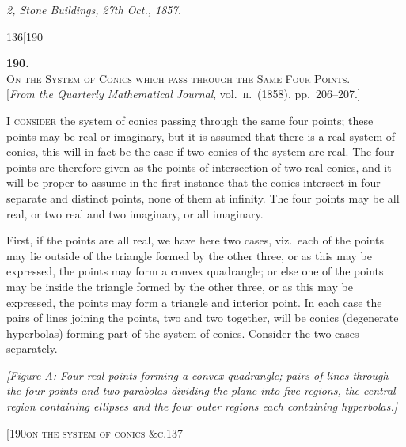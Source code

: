 \documentclass[11pt]{article}
\begin{document}
\medskip
\textit{2, Stone Buildings, 27th Oct., 1857.}

\bigskip
\begin{center}\small\textsc{136}\hfill[190\end{center}

\begin{center}
\textbf{190.}\\[0.5em]
\textsc{On the System of Conics which pass through the Same Four Points.}\\[0.4em]
\small [\textit{From the Quarterly Mathematical Journal}, vol.\ \textsc{ii}.\ (1858), pp.\ 206--207.]
\end{center}

\medskip
\noindent I \textsc{consider} the system of conics passing through the same four points; these
points may be real or imaginary, but it is assumed that there is a real system of
conics, this will in fact be the case if two conics of the system are real. The four
points are therefore given as the points of intersection of two real conics, and it will
be proper to assume in the first instance that the conics intersect in four separate
and distinct points, none of them at infinity. The four points may be all real, or
two real and two imaginary, or all imaginary.

First, if the points are all real, we have here two cases, viz.\ each of the points
may lie outside of the triangle formed by the other three, or as this may be expressed,
the points may form a convex quadrangle; or else one of the points may be inside
the triangle formed by the other three, or as this may be expressed, the points may
form a triangle and interior point. In each case the pairs of lines joining the points,
two and two together, will be conics (degenerate hyperbolas) forming part of the system
of conics. Consider the two cases separately.

\medskip
\textit{[Figure A: Four real points forming a convex quadrangle; pairs of lines through the four points and two parabolas dividing the plane into five regions, the central region containing ellipses and the four outer regions each containing hyperbolas.]}

\begin{center}\small[190\hfill\textsc{on the system of conics \&c.}\hfill\textsc{137}\end{center}
\end{document}
